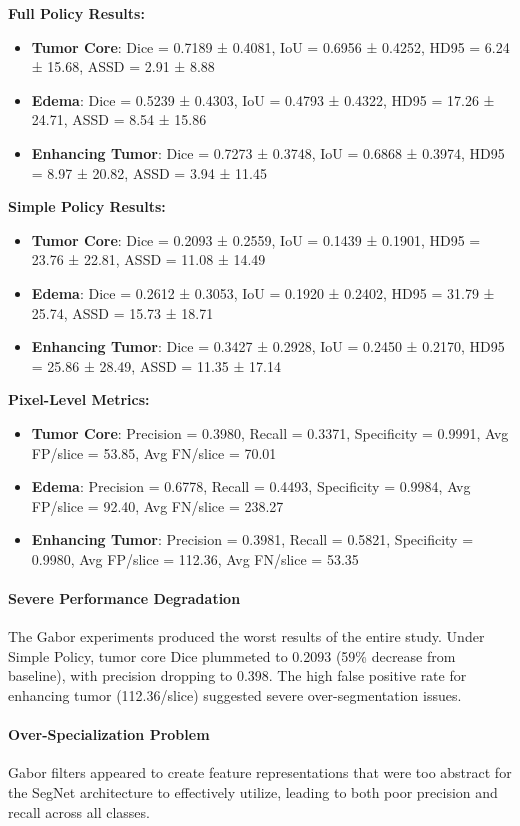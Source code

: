 \textbf{Full Policy Results:}
\begin{itemize}
    \item \textbf{Tumor Core}: Dice = 0.7189 ± 0.4081, IoU = 0.6956 ± 0.4252, HD95 = 6.24 ± 15.68, ASSD = 2.91 ± 8.88
    \item \textbf{Edema}: Dice = 0.5239 ± 0.4303, IoU = 0.4793 ± 0.4322, HD95 = 17.26 ± 24.71, ASSD = 8.54 ± 15.86
    \item \textbf{Enhancing Tumor}: Dice = 0.7273 ± 0.3748, IoU = 0.6868 ± 0.3974, HD95 = 8.97 ± 20.82, ASSD = 3.94 ± 11.45
\end{itemize}

\textbf{Simple Policy Results:}
\begin{itemize}
    \item \textbf{Tumor Core}: Dice = 0.2093 ± 0.2559, IoU = 0.1439 ± 0.1901, HD95 = 23.76 ± 22.81, ASSD = 11.08 ± 14.49
    \item \textbf{Edema}: Dice = 0.2612 ± 0.3053, IoU = 0.1920 ± 0.2402, HD95 = 31.79 ± 25.74, ASSD = 15.73 ± 18.71
    \item \textbf{Enhancing Tumor}: Dice = 0.3427 ± 0.2928, IoU = 0.2450 ± 0.2170, HD95 = 25.86 ± 28.49, ASSD = 11.35 ± 17.14
\end{itemize}

\textbf{Pixel-Level Metrics:}
\begin{itemize}
    \item \textbf{Tumor Core}: Precision = 0.3980, Recall = 0.3371, Specificity = 0.9991, Avg FP/slice = 53.85, Avg FN/slice = 70.01
    \item \textbf{Edema}: Precision = 0.6778, Recall = 0.4493, Specificity = 0.9984, Avg FP/slice = 92.40, Avg FN/slice = 238.27
    \item \textbf{Enhancing Tumor}: Precision = 0.3981, Recall = 0.5821, Specificity = 0.9980, Avg FP/slice = 112.36, Avg FN/slice = 53.35
\end{itemize}

\paragraph{Severe Performance Degradation} The Gabor experiments produced the worst results of the entire study. Under Simple Policy, tumor core Dice plummeted to 0.2093 (59\% decrease from baseline), with precision dropping to 0.398. The high false positive rate for enhancing tumor (112.36/slice) suggested severe over-segmentation issues.

\paragraph{Over-Specialization Problem} Gabor filters appeared to create feature representations that were too abstract for the SegNet architecture to effectively utilize, leading to both poor precision and recall across all classes.


